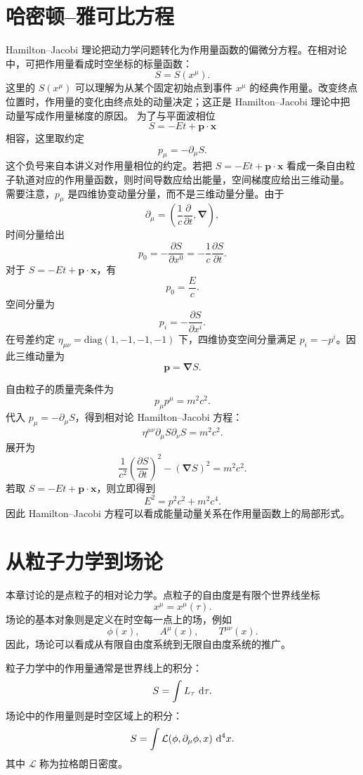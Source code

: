 \section{哈密顿--雅可比方程}

Hamilton--Jacobi 理论把动力学问题转化为作用量函数的偏微分方程。在相对论中，可把作用量看成时空坐标的标量函数：
\[
S=S(x^{\mu}).
\]
这里的 $S(x^\mu)$ 可以理解为从某个固定初始点到事件 $x^\mu$ 的经典作用量。改变终点位置时，作用量的变化由终点处的动量决定；这正是 Hamilton--Jacobi 理论中把动量写成作用量梯度的原因。
为了与平面波相位
\[
S=-Et+\bm{p}\cdot\bm{x}
\]
相容，这里取约定
\[
p_{\mu}=-\partial_{\mu}S.
\]
这个负号来自本讲义对作用量相位的约定。若把 $S=-Et+\bm{p}\cdot\bm{x}$ 看成一条自由粒子轨道对应的作用量函数，则时间导数应给出能量，空间梯度应给出三维动量。
需要注意，$p_{\mu}$ 是四维协变动量分量，而不是三维动量分量。由于
\[
\partial_{\mu}=\left(\frac{1}{c}\frac{\partial}{\partial t},\bm{\nabla}\right),
\]
时间分量给出
\[
p_{0}=-\frac{\partial S}{\partial x^{0}}
=-\frac{1}{c}\frac{\partial S}{\partial t}.
\]
对于 $S=-Et+\bm{p}\cdot\bm{x}$，有
\[
p_{0}=\frac{E}{c}.
\]
空间分量为
\[
p_{i}=-\frac{\partial S}{\partial x^{i}}.
\]
在号差约定 $\eta_{\mu\nu}=\mathrm{diag}(1,-1,-1,-1)$ 下，四维协变空间分量满足 $p_{i}=-p^{i}$。因此三维动量为
\[
\bm{p}=\bm{\nabla}S.
\]

自由粒子的质量壳条件为
\[
p_{\mu}p^{\mu}=m^{2}c^{2}.
\]
代入 $p_{\mu}=-\partial_{\mu}S$，得到相对论 Hamilton--Jacobi 方程：
\[
\eta^{\mu\nu}\partial_{\mu}S\partial_{\nu}S=m^{2}c^{2}.
\]
展开为
\[
\frac{1}{c^{2}}\left(\frac{\partial S}{\partial t}\right)^{2}
-
(\bm{\nabla}S)^{2}
=
m^{2}c^{2}.
\]
若取 $S=-Et+\bm{p}\cdot\bm{x}$，则立即得到
\[
E^{2}=p^{2}c^{2}+m^{2}c^{4}.
\]
因此 Hamilton--Jacobi 方程可以看成能量动量关系在作用量函数上的局部形式。

\section{从粒子力学到场论}

本章讨论的是点粒子的相对论力学。点粒子的自由度是有限个世界线坐标
\[
x^{\mu}=x^{\mu}(\tau).
\]
场论的基本对象则是定义在时空每一点上的场，例如
\[
\phi(x),
\qquad
A^{\mu}(x),
\qquad
T^{\mu\nu}(x).
\]
因此，场论可以看成从有限自由度系统到无限自由度系统的推广。

粒子力学中的作用量通常是世界线上的积分：
\[
S=\int L_{\tau}\,\mathop{}\!\mathrm{d}\tau.
\]
场论中的作用量则是时空区域上的积分：
\[
S=\int \mathcal{L}(\phi,\partial_{\mu}\phi,x)\,\mathop{}\!\mathrm{d}^{4}x.
\]
其中 $\mathcal{L}$ 称为拉格朗日密度。

